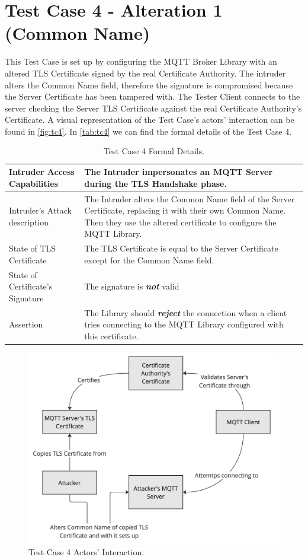 \documentclass[binding=0.6cm,noexaminfo]{sapthesis}
\begin{document}
\section{Test Case 4 - Alteration 1 (Common Name)}
This Test Case is set up by configuring the MQTT Broker Library with an altered TLS Certificate signed by the real Certificate Authority. The intruder alters the Common Name field, therefore the signature is compromised because the Server Certificate has been tampered with. The Tester Client connects to the server checking the Server TLS Certificate against the real Certificate Authority’s Certificate. A visual representation of the Test Case's actors' interaction can be found in \autoref{fig:tc4}.  In \autoref{tab:tc4} we can find the formal details of the Test Case 4.

\begin{table}
\begin{center}
\begin{tabular}{| p{6cm} | p{6cm} |}
\hline
Intruder Access Capabilities & The Intruder impersonates an MQTT Server during the TLS Handshake phase. \\
\hline
Intruder’s Attack description & The Intruder alters the Common Name field of the Server Certificate, replacing it with their own Common Name. Then they use the altered certificate to configure the MQTT Library. \\
\hline
State of TLS Certificate & The TLS Certificate is equal to the Server Certificate except for the Common Name field. \\
\hline
State of Certificate’s Signature & The signature is \textbf{\textit{not}} valid \\
\hline
Assertion & The Library should \textbf{\textit{reject}} the connection when a client tries connecting to the MQTT Library configured with this certificate. \\
\hline
\end{tabular}
\caption{Test Case 4 Formal Details.}
\label{tab:tc4}
\end{center}
\end{table}

\begin{figure}[htb]
	\includegraphics[width=14cm]{TC4}
	\caption{Test Case 4 Actors' Interaction.}
	\label{fig:tc4}
\end{figure}
\end{document}
